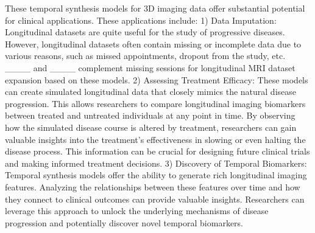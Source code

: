 These temporal synthesis models for 3D imaging data offer substantial potential for clinical applications. These applications include: 1) Data Imputation: Longitudinal datasets are quite useful for the study of progressive diseases. However, longitudinal datasets often contain missing or incomplete data due to various reasons, such as missed appointments, dropout from the study, etc. ____ and ____ complement missing sessions for longitudinal MRI dataset expansion based on these models. 2) Assessing Treatment Efficacy: These models can create simulated longitudinal data that closely mimics the natural disease progression. This allows researchers to compare longitudinal imaging biomarkers between treated and untreated individuals at any point in time. By observing how the simulated disease course is altered by treatment, researchers can gain valuable insights into the treatment's effectiveness in slowing or even halting the disease process. This information can be crucial for designing future clinical trials and making informed treatment decisions. 3) Discovery of Temporal Biomarkers: Temporal synthesis models offer the ability to generate rich longitudinal imaging features. Analyzing the relationships between these features over time and how they connect to clinical outcomes can provide valuable insights. Researchers can leverage this approach to unlock the underlying mechanisms of disease progression and potentially discover novel temporal biomarkers.


